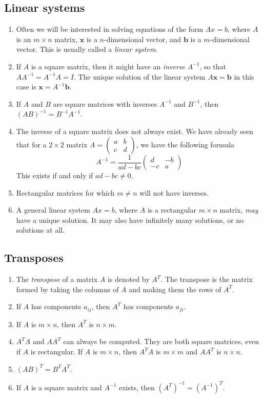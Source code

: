 \documentclass[11pt]{article}
\renewcommand*{\vec}[1]{\mathbf{#1}}
\begin{document}
\subsection{Linear systems}
\begin{enumerate}
\item Often we will be interested in solving equations of the form $\boxed{Ax=b}$, where $A$ is an $m\times n$ matrix, $\vec{x}$ is a $n$-dimensional vector, and $\vec{b}$ is a $m$-dimensional vector. This is usually called a \emph{linear system}.
\item If $A$ is a square matrix, then it might have an \emph{inverse} $A^{-1}$, so that $AA^{-1}=A^{-1}A=I$. The  unique solution of the linear system $A\vec{x}=\vec{b}$ in this case is $\vec{x}=A^{-1}\vec{b}$. 
\item If $A$ and $B$ are square matrices with inverses $A^{-1}$ and $B^{-1}$, then $\boxed{(AB)^{-1}=B^{-1}A^{-1}}$. 
\item The inverse of a square matrix does not always exist. We have already seen that for a $2\times 2$ matrix $A=\begin{pmatrix} a & b \\ c & d \end{pmatrix}$, we have the following formula
$$\boxed{A^{-1} = \frac{1}{ad-bc} \begin{pmatrix} d & -b \\ -c & a \end{pmatrix}}$$
This exists if and only if $\boxed{ad-bc\neq 0}$. 
\item Rectangular matrices for which $m\neq n$ will not have inverses.
\item A general linear system $Ax=b$, where $A$ is a rectangular $m\times n$ matrix, \emph{may} have a unique solution. It may also have infinitely many solutions, or no solutions at all. 
\end{enumerate}
\subsection{Transposes}
\begin{enumerate}
\item The \emph{transpose} of a matrix $A$ is denoted by $A^T$. The transpose is the matrix formed by taking the columns of $A$ and making them the rows of $A^T$. 
\item If $A$ has components $a_{ij}$, then $A^T$ has components $a_{ji}$.
\item If $A$ is $m\times n$, then $A^T$ is $n\times m$.
\item $A^TA$ and $AA^T$ can always be computed. They are both square matrices, even if $A$ is rectangular. If $A$ is $m\times n$, then $A^TA$ is $m\times m$ and $AA^T$ is $n\times n$.
\item $\boxed{(AB)^T = B^TA^T}$.
\item If $A$ is a square matrix and $A^{-1}$ exists, then $\boxed{(A^T)^{-1} = (A^{-1})^T}$. 
\end{enumerate}
\end{document}
